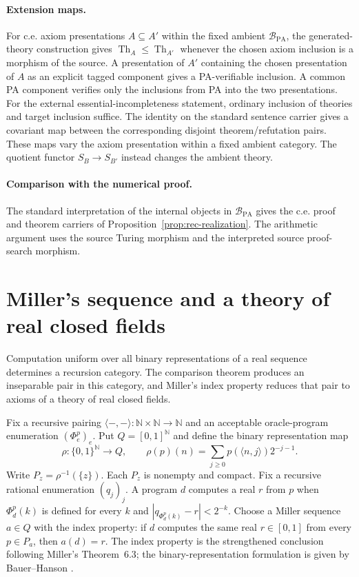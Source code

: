 \documentclass[11pt]{article}
\theoremstyle{definition}\newtheorem{definition}[theorem]{Definition}
\newcommand{\PA}{\mathrm{PA}}
\newcommand{\N}{\mathbb N}
\newcommand{\Th}{\operatorname{Th}}
\newcommand{\B}{\mathcal B}
\begin{document}
\paragraph{Extension maps.}
For c.e. axiom presentations $A\subseteq A'$ within the fixed
ambient $\B_{\PA}$, the generated-theory construction gives
$\Th_A\le\Th_{A'}$ whenever the chosen axiom inclusion is a
morphism of the source. A presentation of $A'$ containing the chosen
presentation of $A$ as an explicit tagged component gives a
PA-verifiable inclusion. A common PA component verifies only the
inclusions from PA into the two presentations. For the
external essential-incompleteness statement, ordinary inclusion of
theories and target inclusion suffice. The identity on the standard sentence
carrier gives a covariant map between the corresponding disjoint
theorem/refutation pairs. These maps vary the axiom presentation
within a fixed ambient category. The quotient functor
$S_B\to S_{B'}$ instead changes the ambient theory.

\paragraph{Comparison with the numerical proof.}
The standard interpretation of the internal objects in $\B_{\PA}$
gives the c.e. proof and theorem carriers of
Proposition~\ref{prop:rec-realization}. The arithmetic argument uses the
source Turing morphism and the interpreted source proof-search
morphism.

\section{Miller's sequence and a theory of real closed fields}
Computation uniform over all binary representations of a real
sequence determines a recursion category. The comparison theorem
produces an inseparable pair in this category, and Miller's index
property reduces that pair to axioms of a theory of real closed fields.

Fix a recursive pairing $\langle-,-\rangle:\N\times\N\to\N$
and an acceptable oracle-program enumeration $(\Phi_e^p)_e$.
Put $Q=[0,1]^{\N}$ and define the binary representation map
\[
 \rho:\{0,1\}^{\N}\to Q,\qquad
 \rho(p)(n)=\sum_{j\ge0}p(\langle n,j\rangle)2^{-j-1}.
\]
Write $P_z=\rho^{-1}(\{z\})$. Each $P_z$ is nonempty and compact.
Fix a recursive rational enumeration $(q_j)_j$. A program $d$
computes a real $r$ from $p$ when $\Phi_d^p(k)$ is defined for
every $k$ and $|q_{\Phi_d^p(k)}-r|<2^{-k}$. Choose a Miller
sequence $a\in Q$ with the index property: if $d$ computes the
same real $r\in[0,1]$ from every $p\in P_a$, then $a(d)=r$.
The index property is the strengthened conclusion following
Miller's Theorem~6.3; the binary-representation formulation is
given by Bauer--Hanson
\cite[Theorem~6.3 and following paragraph]{Miller}
\cite[\S2.1 and Theorem~2.2]{BauerHanson}.
\end{document}
